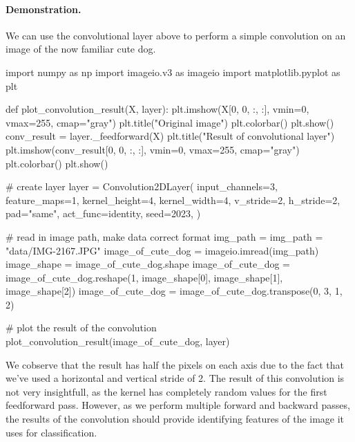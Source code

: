\documentclass[%
oneside,                 %
final,                   %
10pt]{article}
\begin{document}
\paragraph{Demonstration.}
We can use the convolutional layer above to perform a simple convolution on an image of the now familiar cute dog.







































\bpycod
import numpy as np
import imageio.v3 as imageio
import matplotlib.pyplot as plt

def plot_convolution_result(X, layer):
    plt.imshow(X[0, 0, :, :], vmin=0, vmax=255, cmap="gray")
    plt.title("Original image")
    plt.colorbar()
    plt.show()
    conv_result = layer._feedforward(X)
    plt.title("Result of convolutional layer")
    plt.imshow(conv_result[0, 0, :, :], vmin=0, vmax=255, cmap="gray")
    plt.colorbar()
    plt.show()

# create layer
layer = Convolution2DLayer(
    input_channels=3,
    feature_maps=1,
    kernel_height=4,
    kernel_width=4,
    v_stride=2,
    h_stride=2,
    pad="same",
    act_func=identity,
    seed=2023,
    )

# read in image path, make data correct format
img_path = img_path = "data/IMG-2167.JPG"
image_of_cute_dog = imageio.imread(img_path)
image_shape = image_of_cute_dog.shape
image_of_cute_dog = image_of_cute_dog.reshape(1, image_shape[0], image_shape[1], image_shape[2])
image_of_cute_dog = image_of_cute_dog.transpose(0, 3, 1, 2)

# plot the result of the convolution
plot_convolution_result(image_of_cute_dog, layer)

\epycod


We cobserve that the result has half the pixels on each axis due to
the fact that we've used a horizontal and vertical stride of 2. The
result of this convolution is not very insightfull, as the kernel has
completely random values for the first feedforward pass. However, as
we perform multiple forward and backward passes, the results of the
convolution should provide identifying features of the image it uses
for classification.
\end{document}
